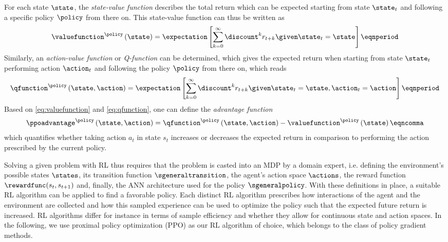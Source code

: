 For each state $\state$, the \textit{state-value function} describes the total return which can be expected starting from state $\state_t$ and following a specific policy $\policy$ from there on.
This state-value function can thus be written as
\begin{equation}
  \valuefunction^\policy \left(\state\right) = \expectation\left[\sum_{k=0}^\infty \discount^k r_{t+k}\given\state_t=\state\right] \eqnperiod
  \label{eq:valuefunction}
\end{equation}
Similarly, an \textit{action-value function} or \textit{Q-function} can be determined, which gives the expected return when starting from state $\state_t$ performing action $\action_t$ and following the policy $\policy$ from there on, which reads
\begin{equation}
  \qfunction^\policy \left(\state,\action\right) = \expectation\left[\sum_{k=0}^\infty \discount^k r_{t+k}\given\state_t=\state, \action_t=\action\right] \eqnperiod
  \label{eq:qfunction}
\end{equation}
Based on \eqref{eq:valuefunction} and \eqref{eq:qfunction}, one can define the \textit{advantage function}
\begin{equation}
  \ppoadvantage^\policy \left(\state,\action\right) =  \qfunction^\policy \left(\state,\action\right) - \valuefunction^\policy \left(\state\right) \eqncomma
  \label{eq:advantagefunction}
\end{equation}
which quantifies whether taking action $a_t$ in state $s_t$ increases or decreases the expected return in comparison to performing the action prescribed by the current policy.

Solving a given problem with RL thus requires that the problem is casted into an MDP by a domain expert, i.e. defining the environment's possible states $\states$, its transition function $\sgeneraltransition$, the agent's action space $\actions$, the reward function $\rewardfunc(s_t,s_{t+1})$ and, finally, the ANN architecture used for the policy $\sgeneralpolicy$.
With these definitions in place, a suitable RL algorithm can be applied to find a favorable policy.
Each distinct RL algorithm prescribes how interactions of the agent and the environment are collected and how this sampled experience can be used to optimize the policy such that the expected future return is increased.
RL algorithms differ for instance in terms of sample efficiency and whether they allow for continuous state and action spaces.
In the following, we use proximal policy optimization (PPO) as our RL algorithm of choice, which belongs to the class of policy gradient methods.





